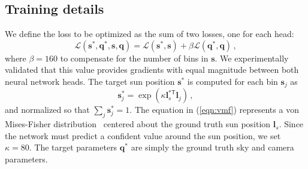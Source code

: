 \subsection{Training details}

We define the loss to be optimized as the sum of two losses, one for each head: 
%
\begin{equation}
\mathcal{L}(\mathbf{s}^*, \mathbf{q}^*, \mathbf{s}, \mathbf{q}) = \mathcal{L}(\mathbf{s}^*, \mathbf{s}) + \beta \mathcal{L}(\mathbf{q}^*, \mathbf{q}) \,,
\label{eqn:ch3_loss}
\end{equation}
%
where $\beta = 160$ to compensate for the number of bins in $\mathbf{s}$. We experimentally validated that this value provides gradients with equal magnitude between both neural network heads. The target sun position $\mathbf{s}^*$ is computed for each bin $\mathbf{s}_j$ as 
%
\begin{equation}
\mathbf{s}^*_j = \exp(\kappa \mathbf{l}_s^{*\mathsf{T}} \mathbf{l}_j) \,,
\label{eqn:vmf}
\end{equation}
%
and normalized so that $\sum_j \mathbf{s}^*_j = 1$. The equation in (\ref{eqn:vmf}) represents a von Mises-Fisher distribution~\cite{banerjee-jmlr-05} centered about the ground truth sun position $\mathbf{l}_s$. Since the network must predict a confident value around the sun position, we set $\kappa = 80$. The target parameters $\mathbf{q}^*$ are simply the ground truth sky and camera parameters. 

